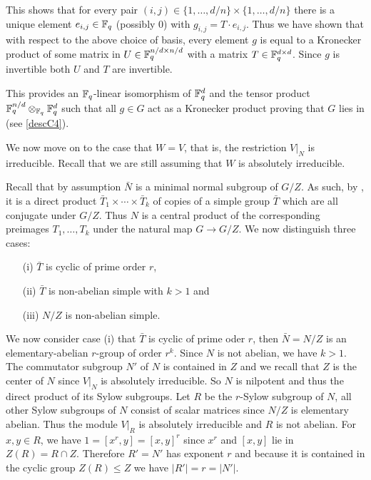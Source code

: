 This shows that for every pair $(i,j) \in \{ 1, \ldots, d/n \} \times 
\{ 1, \ldots, d/n \}$ there
is a unique element $e_{i,j} \in \mathbb{F}_q$ (possibly $0$) with 
$g_{i,j} = T \cdot e_{i,j}$. Thus we have shown that with respect to
the above choice of basis, every element $g$ is equal to a Kronecker 
product of some matrix in $U \in \mathbb{F}_q^{n/d \times n/d}$ with a matrix
$T \in \mathbb{F}_q^{d \times d}$. Since $g$ is invertible both 
$U$ and $T$ are invertible. 

This provides an $\mathbb{F}_q$-linear isomorphism of 
$\mathbb{F}_q^d$ and the tensor product $\mathbb{F}_q^{n/d} \otimes_{\mathbb{F}_q} \mathbb{F}_q^d$
such that all $g \in G$ act as a Kronecker product proving that
$G$ lies in  (see \ref{descC4}).

We now move on to the case that $W = V$, that is, the restriction
$V|_N$ is irreducible. Recall that we are still assuming that $W$ is
absolutely irreducible.

Recall that by assumption $\bar N$ is a minimal normal subgroup of $G/Z$.
As such, by \cite[Theorem 4.3A.(iii)]{DixonMort}, it is
a direct product $\bar T_1 \times \cdots \times \bar T_k$ of copies of a 
simple group $\bar T$ which are all conjugate under $G/Z$. Thus $N$ is
a central product of the corresponding preimages $T_1, \ldots, T_k$
under the natural map $G \to G/Z$. We now distinguish three cases:
\begin{itemize}\setlength{\itemsep}{0pt}\setlength{\parskip}{0pt}
\item[(i)] $\bar T$ is cyclic of prime order $r$, 
\item[(ii)] $\bar T$ is non-abelian simple with $k > 1$ and
\item[(iii)] $N/Z$ is non-abelian simple.
\end{itemize}
We now consider case (i) that $\bar T$ is cyclic of prime oder $r$, then
$\bar N = N/Z$ is an elementary-abelian $r$-group of order $r^k$.
Since $N$ is not abelian, we have $k > 1$.
The commutator subgroup $N'$ of $N$ is contained in $Z$ and
we recall that $Z$ is the center of $N$ since $V|_N$ is absolutely
irreducible. So $N$ is nilpotent and thus the direct product of its
Sylow subgroups. Let $R$ be the $r$-Sylow subgroup of $N$, all other
Sylow subgroups of $N$ consist of scalar matrices since $N/Z$ is
elementary abelian. Thus the module $V|_R$ is absolutely irreducible
and $R$ is not abelian.
For $x,y \in R$, we have $1 = [x^r,y] = [x,y]^r$ since $x^r$ and 
$[x,y]$ lie in $Z(R) = R \cap Z$. Therefore $R'=N'$ has exponent $r$ and
because it is contained in the cyclic group $Z(R) \le Z$ we have $|R'| =
r = |N'|$.

